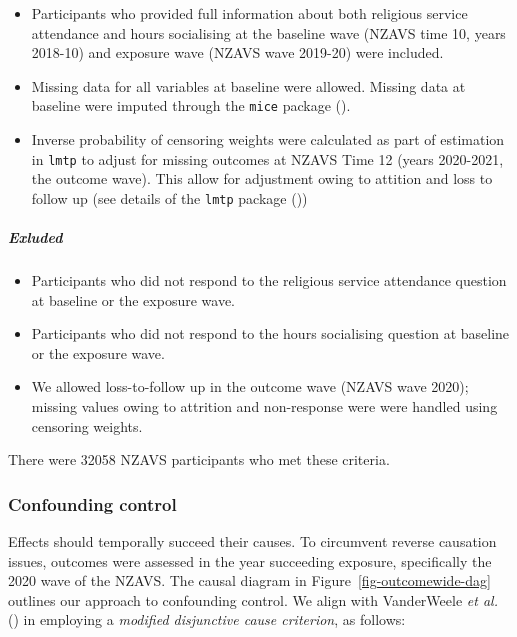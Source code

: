 \documentclass[
  singlecolumn]{article}
\let\oldsubparagraph\subparagraph
\renewcommand{\subparagraph}[1]{\oldsubparagraph{#1}\mbox{}}
\providecommand{\tightlist}{%
  \setlength{\itemsep}{0pt}\setlength{\parskip}{0pt}}\usepackage{longtable,booktabs,array}
\begin{document}
\begin{itemize}
\tightlist
\item
  Participants who provided full information about both religious
  service attendance and hours socialising at the baseline wave (NZAVS
  time 10, years 2018-10) and exposure wave (NZAVS wave 2019-20) were
  included.
\item
  Missing data for all variables at baseline were allowed. Missing data
  at baseline were imputed through the \texttt{mice} package
  ().
\item
  Inverse probability of censoring weights were calculated as part of
  estimation in \texttt{lmtp} to adjust for missing outcomes at NZAVS
  Time 12 (years 2020-2021, the outcome wave). This allow for adjustment
  owing to attition and loss to follow up (see details of the
  \texttt{lmtp} package ())
\end{itemize}

\subparagraph{Exluded}\label{exluded}

\begin{itemize}
\tightlist
\item
  Participants who did not respond to the religious service attendance
  question at baseline or the exposure wave.
\item
  Participants who did not respond to the hours socialising question at
  baseline or the exposure wave.
\item
  We allowed loss-to-follow up in the outcome wave (NZAVS wave 2020);
  missing values owing to attrition and non-response were were handled
  using censoring weights.
\end{itemize}

There were 32058 NZAVS participants who met these criteria.

\subsubsection{Confounding control}\label{confounding-control}

Effects should temporally succeed their causes. To circumvent reverse
causation issues, outcomes were assessed in the year succeeding
exposure, specifically the 2020 wave of the NZAVS. The causal diagram in
Figure~\ref{fig-outcomewide-dag} outlines our approach to confounding
control. We align with VanderWeele \emph{et al.}
() in employing a \emph{modified
disjunctive cause criterion}, as follows:
\end{document}

